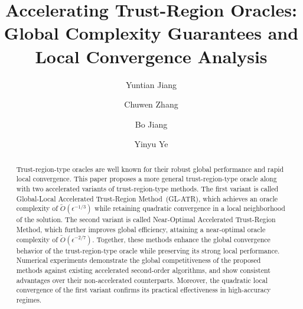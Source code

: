 \documentclass{mcom-l}
\numberwithin{equation}{section}
\begin{document}
\title[Accelerating Trust-Region Oracles]{Accelerating Trust-Region Oracles: Global Complexity Guarantees and Local Convergence Analysis}


\author{Yuntian Jiang}
\address{School of Information Management and Engineering, Shanghai University of Finance and Economics, Shanghai 200433, China}

\author{Chuwen Zhang}
\address{Booth School of Business, University of Chicago, Chicago, IL 60637, USA}

\author{Bo Jiang}
\address{School of Information Management and Engineering, Shanghai University of Finance and Economics, Shanghai 200433, China}

\author{Yinyu Ye}
\address{Department of Management Science and Engineering, Stanford University, Stanford, CA 94305, USA}





\begin{abstract}
    Trust-region-type oracles are well known for their robust global performance and rapid local convergence. This paper proposes a more general trust-region-type oracle along with two accelerated variants of trust-region-type methods. The first variant is called Global-Local Accelerated Trust-Region Method~(GL-ATR), which achieves an oracle complexity of $\tilde O(\epsilon^{-1/3})$ while retaining quadratic convergence in a local neighborhood of the solution. The second variant is called Near-Optimal Accelerated Trust-Region Method, which further improves global efficiency, attaining a near-optimal oracle complexity of $\tilde O(\epsilon^{-2/7})$. Together, these methods enhance the global convergence behavior of the trust-region-type oracle while preserving its strong local performance. Numerical experiments demonstrate the global competitiveness of the proposed methods against existing accelerated second-order algorithms, and show consistent advantages over their non-accelerated counterparts. Moreover, the quadratic local convergence of the first variant confirms its practical effectiveness in high-accuracy regimes.
\end{abstract}
\maketitle
\end{document}
